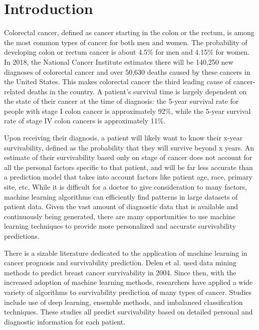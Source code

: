 \documentclass[review]{elsarticle}
\begin{document}
\section{Introduction}
Colorectal cancer, defined as cancer starting in the colon or the rectum, is among the most common types of cancer for both men and women. The probability of developing colon or rectum cancer is about 4.5\% for men and 4.15\% for women. In 2018, the National Cancer Institute estimates there will be 140,250 new diagnoses of colorectal cancer and over 50,630 deaths caused by these cancers in the United States\cite{colorectal-stats}. This makes colorectal cancer the third leading cause of cancer-related deaths in the country. A patient’s survival time is largely dependent on the state of their cancer at the time of diagnosis: the 5-year survival rate for people with stage I colon cancer is approximately 92\%, while the 5-year survival rate of stage IV colon cancers is approximately 11\%\cite{colorectal-survival-stats}.

Upon receiving their diagnosis, a patient will likely want to know their x-year survivability, defined as the probability that they will survive beyond x years. An estimate of their survivability based only on stage of cancer does not account for all the personal factors specific to that patient, and will be far less accurate than a prediction model that takes into account factors like patient age, race, primary site, etc. While it is difficult for a doctor to give consideration to many factors, machine learning algorithms can efficiently find patterns in large datasets of patient data. Given the vast amount of diagnostic data that is available and continuously being generated, there are many opportunities to use machine learning techniques to provide more personalized and accurate survivability predictions. 

There is a sizable literature dedicated to the application of machine learning in cancer prognosis and survivability prediction. Delen et al. used data mining methods to predict breast cancer survivability in 2004\cite{delen2005predicting}. Since then, with the increased adoption of machine learning methods, researchers have applied a wide variety of algorithms to survivability prediction of many types of cancer. Studies include use of deep learning\cite{delen2005predicting,al2017survivability}, ensemble methods\cite{al2013colon}, and imbalanced classification techniques\cite{liu2009decision}. These studies all predict survivability based on detailed personal and diagnostic information for each patient.
\end{document}
